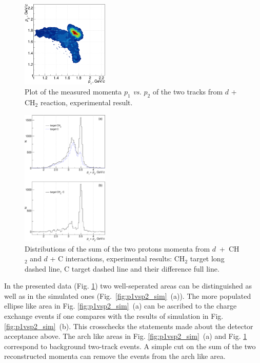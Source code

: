 \documentclass[twocolumn,epjc3]{svjour3}
\begin{document}
\begin{figure}[h]
  \centering
  \includegraphics[width=0.37\textwidth]{p1_vs_p2_2.pdf}
  \caption{Plot of the measured momenta $p_1$ \textit{vs.} $p_2$ of the two
    tracks from $d$ + CH$_{2}$ reaction, experimental result.}
  \label{fig:p1vsp2_exp}
\end{figure}

\begin{figure}[b]
  \centering
  \includegraphics[width=0.37\textwidth]{p1_plus_p2_1.pdf}    %
  \caption{Distributions of the sum of the two protons momenta from
    $d$~+~CH$_{2}$ and $d$ + C interactions, experimental results: CH$_2$ target
    long dashed line, C target dashed line and their difference full line.}
  \label{fig:p1p2exp}
\end{figure}

In the presented data (Fig. \ref{fig:p1vsp2_exp}) two well-seperated areas can
be distinguished as well as in the simulated ones
(Fig.~\ref{fig:p1vsp2_sim}~(a)). The more populated ellipse like area in
Fig. \ref{fig:p1vsp2_sim}~(a) can be ascribed to the charge exchange events if
one compares with the results of simulation in
Fig. \ref{fig:p1vsp2_sim}~(b). This crosschecks the statements made about the
detector acceptance above. The arch like areas in Fig. \ref{fig:p1vsp2_sim}~(a)
and Fig. \ref{fig:p1vsp2_exp} correspond to background two-track events. A
simple cut on the sum of the two reconstructed momenta can remove the events
from the arch like area.
\end{document}
